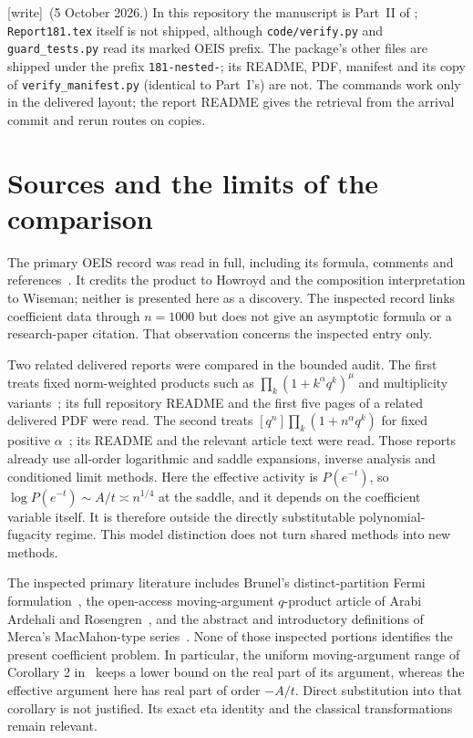 \documentclass[11pt]{article}
\theoremstyle{remark}\newtheorem{remark}[theorem]{Remark}
\newcommand{\wtag}{\textup{[write]}}
\begin{document}
\wtag\ (5 October 2026.) In this repository the manuscript is Part~II of
; \texttt{Report181.tex} itself is not shipped, although
\texttt{code/verify.py} and \texttt{guard\_tests.py} read its marked OEIS
prefix. The package's other files are shipped under the prefix
\texttt{181-nested-}; its README, PDF, manifest and its copy of
\texttt{verify\_manifest.py} (identical to Part~I's) are not. The commands
work only in the delivered layout; the report README gives the retrieval
from the arrival commit and rerun routes on copies.

\section{Sources and the limits of the comparison}\label{stp:len:sec:sources}
The primary OEIS record was read in full, including its formula, comments and references~\cite{oeisA358836}. It credits the product to Howroyd and the composition interpretation to Wiseman; neither is presented here as a discovery. The inspected record links coefficient data through $n=1000$ but does not give an asymptotic formula or a research-paper citation. That observation concerns the inspected entry only.

Two related delivered reports were compared in the bounded audit. The first treats fixed norm-weighted products such as $\prod_k(1+k^\alpha q^k)^\mu$ and multiplicity variants~\cite{priornorm}; its full repository README and the first five pages of a related delivered PDF were read. The second treats $[q^n]\prod_k(1+n^\alpha q^k)$ for fixed positive $\alpha$~\cite{priorfugacity}; its README and the relevant article text were read. Those reports already use all-order logarithmic and saddle expansions, inverse analysis and conditioned limit methods. Here the effective activity is $P(e^{-t})$, so $\log P(e^{-t})\sim A/t\asymp n^{1/4}$ at the saddle, and it depends on the coefficient variable itself. It is therefore outside the directly substitutable polynomial-fugacity regime. This model distinction does not turn shared methods into new methods.

The inspected primary literature includes Brunel's distinct-partition Fermi formulation~\cite{brunel}, the open-access moving-argument $q$-product article of Arabi Ardehali and Rosengren~\cite{ardehali}, and the abstract and introductory definitions of Merca's MacMahon-type series~\cite{merca}. None of those inspected portions identifies the present coefficient problem. In particular, the uniform moving-argument range of Corollary 2 in~\cite{ardehali} keeps a lower bound on the real part of its argument, whereas the effective argument here has real part of order $-A/t$. Direct substitution into that corollary is not justified. Its exact eta identity and the classical transformations remain relevant.
\end{document}
